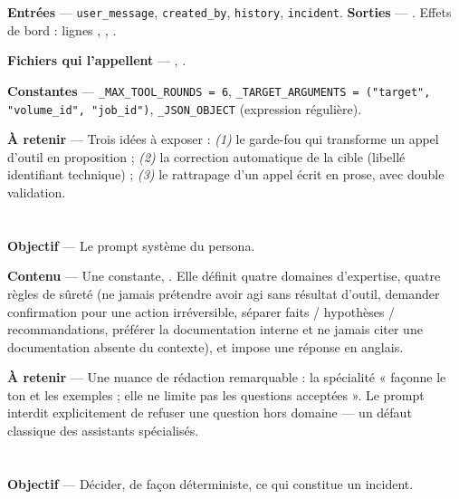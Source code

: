 \textbf{Entrées} --- \texttt{user\_message}, \texttt{created\_by},
\texttt{history}, \texttt{incident}.
\textbf{Sorties} --- . Effets de bord : lignes
, , .

\textbf{Fichiers qui l'appellent} --- ,
.

\textbf{Constantes} --- \texttt{\_MAX\_TOOL\_ROUNDS = 6},
\texttt{\_TARGET\_ARGUMENTS = ("target", "volume\_id", "job\_id")},
\texttt{\_JSON\_OBJECT} (expression régulière).

\textbf{À retenir} --- Trois idées à exposer : \emph{(1)} le garde-fou qui
transforme un appel d'outil en proposition ; \emph{(2)} la correction
automatique de la cible (libellé \arrowto{} identifiant technique) ; \emph{(3)}
le rattrapage d'un appel écrit en prose, avec double validation.

\section{}

\textbf{Objectif} --- Le prompt système du persona.

\textbf{Contenu} --- Une constante, . Elle définit
quatre domaines d'expertise, quatre règles de sûreté (ne jamais prétendre avoir
agi sans résultat d'outil, demander confirmation pour une action irréversible,
séparer faits / hypothèses / recommandations, préférer la documentation interne
et ne jamais citer une documentation absente du contexte), et impose une
réponse en anglais.

\textbf{À retenir} --- Une nuance de rédaction remarquable : la spécialité
« façonne le ton et les exemples ; elle ne limite pas les questions acceptées ».
Le prompt interdit explicitement de refuser une question hors domaine --- un
défaut classique des assistants spécialisés.

\section{}

\textbf{Objectif} --- Décider, de façon déterministe, ce qui constitue un
incident.


